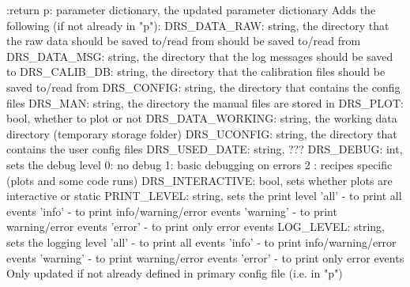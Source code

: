 \begin{minipage}{\textwidth}
\begin{pythondocstring}
:return p: parameter dictionary, the updated parameter dictionary
        Adds the following (if not already in "p"):
            DRS_DATA_RAW: string, the directory that the raw data should
                          be saved to/read from
                            should be saved to/read from
            DRS_DATA_MSG: string, the directory that the log messages
                          should be saved to
            DRS_CALIB_DB: string, the directory that the calibration
                          files should be saved to/read from
            DRS_CONFIG: string, the directory that contains the config files
            DRS_MAN: string, the directory the manual files are stored in
            DRS_PLOT: bool, whether to plot or not
            DRS_DATA_WORKING: string, the working data directory (temporary
                              storage folder)
			DRS_UCONFIG: string, the directory that contains the user config
			             files
            DRS_USED_DATE: string, ???
            DRS_DEBUG: int, sets the debug level
                            0: no debug
                            1: basic debugging on errors
                            2 : recipes specific (plots and some code runs)
            DRS_INTERACTIVE: bool, sets whether plots are interactive or
                             static
            PRINT_LEVEL: string, sets the print level
                               'all' - to print all events
                               'info' - to print info/warning/error events
                               'warning' - to print warning/error events
                               'error' - to print only error events
            LOG_LEVEL: string, sets the logging level
                               'all' - to print all events
                               'info' - to print info/warning/error events
                               'warning' - to print warning/error events
                               'error' - to print only error events
    Only updated if not already defined in primary config file
    (i.e. in "p")
\end{pythondocstring}
\end{minipage}

